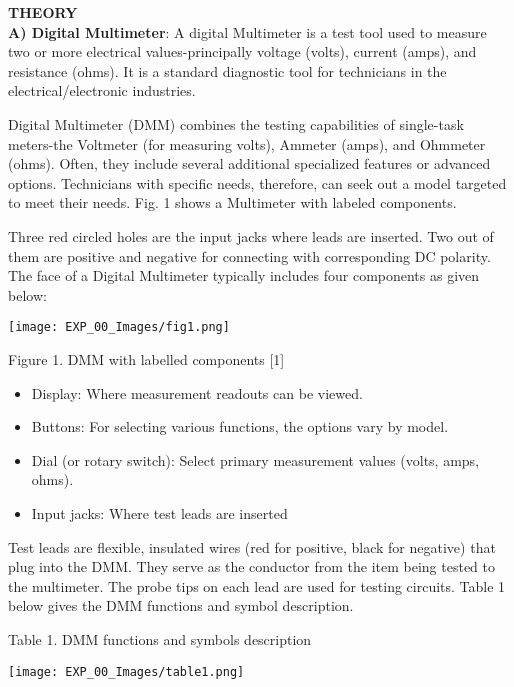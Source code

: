 \documentclass[12pt,a4paper]{article}
\begin{document}
\begin{justify}
\textbf{\large THEORY}\\[3pt]
\textbf{A)	Digital Multimeter}: A digital Multimeter is a test tool used to measure two or more electrical values-principally voltage (volts), current (amps), and resistance (ohms). It is a standard diagnostic tool for technicians in the electrical/electronic industries.\par
\noindent Digital Multimeter (DMM) combines the testing capabilities of single-task meters-the Voltmeter (for measuring volts), Ammeter (amps), and Ohmmeter (ohms). Often, they include several additional specialized features or advanced options. Technicians with specific needs, therefore, can seek out a model targeted to meet their needs. Fig. 1 shows a Multimeter with labeled components.\par
\noindent Three red circled holes are the input jacks where leads are inserted. Two out of them are positive and negative for connecting with corresponding DC polarity. The face of a Digital Multimeter typically includes four components as given below:

\begin{center} 
\texttt{[image: EXP\_00\_Images/fig1.png]}
\end{center}
\vspace{-10mm}
\begin{center} {Figure 1. DMM with labelled components [1]}\end{center}

\begin{itemize}
\setlength\itemsep{-0.3em}
\item Display: Where measurement readouts can be viewed.
\item Buttons: For selecting various functions, the options vary by model.
\item Dial (or rotary switch): Select primary measurement values (volts, amps, ohms).
\item Input jacks: Where test leads are inserted
\end{itemize}

\noindent Test leads are flexible, insulated wires (red for positive, black for negative) that plug into the DMM. They serve as the conductor from the item being tested to the multimeter. The probe tips on each lead are used for testing circuits. Table 1 below gives the DMM functions and symbol description.
\vspace{-6mm}
\begin{center} {Table 1. DMM functions and symbols description}\end{center}
\vspace{-10mm}
\begin{center} 
\texttt{[image: EXP\_00\_Images/table1.png]}
\end{center}



\end{justify}
\end{document}
